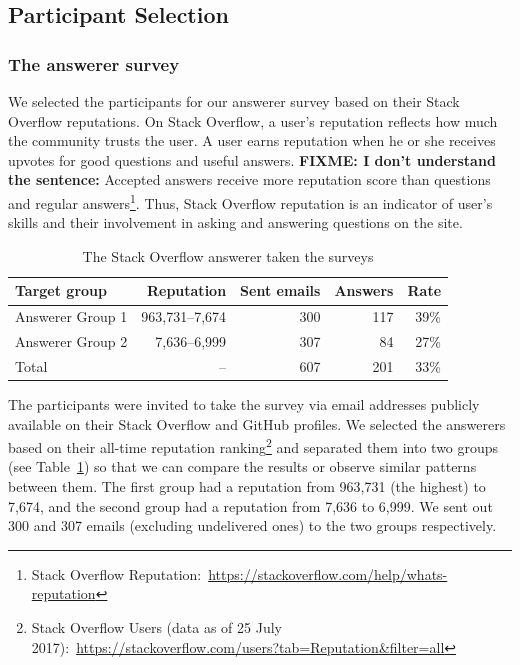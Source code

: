\documentclass{svjour3}                     %
\newcommand\FIXME[1]{\textbf{FIXME: #1}}
\begin{document}
\subsection{Participant Selection}

\subsubsection{The answerer survey} 
We selected the participants for our answerer survey based on their Stack
Overflow reputations. On Stack Overflow, a user's reputation reflects how much
the community trusts the user. A user earns reputation when he or she receives
upvotes for good questions and useful answers. \FIXME{I don't
  understand the sentence:} Accepted answers receive more
reputation score than questions and regular answers\footnote{Stack Overflow
	Reputation:~\url{https://stackoverflow.com/help/whats-reputation}}. Thus, Stack
Overflow reputation is an indicator of user's skills and their involvement in
asking and answering questions on the site.

\begin{table}
	\centering
	\caption{The Stack Overflow answerer taken the surveys}
	\label{tab:answerers}
	\begin{tabular}{lrrrr}
		\toprule
		Target group & Reputation & Sent emails & Answers & Rate \\
		\midrule
		Answerer Group 1 & 963,731--7,674 & 300 & 117 & 39\% \\
		Answerer Group 2 & 7,636--6,999 & 307 & 84 & 27\% \\
		\midrule
		Total & -- & 607 & 201 & 33\% \\
		\bottomrule
	\end{tabular}
\end{table}

The participants were invited to take the survey via email addresses publicly
available on their Stack Overflow and GitHub profiles. We selected the answerers
based on their all-time reputation ranking\footnote{Stack Overflow Users (data as of
	25 July 2017):~\url{https://stackoverflow.com/users?tab=Reputation&filter=all}}
and separated them into two groups (see Table~\ref{tab:answerers}) so that we
can compare the results or observe similar patterns between them. The first
group had a reputation from 963,731 (the highest) to 7,674, and the second group
had a reputation from 7,636 to 6,999. We sent out 300 and 307 emails
(excluding undelivered ones) to the two groups respectively. 
\end{document}
